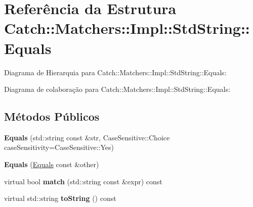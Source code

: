 \hypertarget{structCatch_1_1Matchers_1_1Impl_1_1StdString_1_1Equals}{}\section{Referência da Estrutura Catch\+:\+:Matchers\+:\+:Impl\+:\+:Std\+String\+:\+:Equals}
\label{structCatch_1_1Matchers_1_1Impl_1_1StdString_1_1Equals}


Diagrama de Hierarquia para Catch\+:\+:Matchers\+:\+:Impl\+:\+:Std\+String\+:\+:Equals\+:


Diagrama de colaboração para Catch\+:\+:Matchers\+:\+:Impl\+:\+:Std\+String\+:\+:Equals\+:
\subsection*{Métodos Públicos}
\begin{DoxyCompactItemize}
\item 
{\bfseries Equals} (std\+::string const \&str, Case\+Sensitive\+::\+Choice case\+Sensitivity=Case\+Sensitive\+::\+Yes)\hypertarget{structCatch_1_1Matchers_1_1Impl_1_1StdString_1_1Equals_a5921d5ed75320fb64a678e3f1292a464}{}\label{structCatch_1_1Matchers_1_1Impl_1_1StdString_1_1Equals_a5921d5ed75320fb64a678e3f1292a464}

\item 
{\bfseries Equals} (\hyperlink{structCatch_1_1Matchers_1_1Impl_1_1StdString_1_1Equals}{Equals} const \&other)\hypertarget{structCatch_1_1Matchers_1_1Impl_1_1StdString_1_1Equals_acaa97de06aedf363ae803d65a975f5e4}{}\label{structCatch_1_1Matchers_1_1Impl_1_1StdString_1_1Equals_acaa97de06aedf363ae803d65a975f5e4}

\item 
virtual bool {\bfseries match} (std\+::string const \&expr) const \hypertarget{structCatch_1_1Matchers_1_1Impl_1_1StdString_1_1Equals_a00c8259a76c24da669e116662ededc70}{}\label{structCatch_1_1Matchers_1_1Impl_1_1StdString_1_1Equals_a00c8259a76c24da669e116662ededc70}

\item 
virtual std\+::string {\bfseries to\+String} () const \hypertarget{structCatch_1_1Matchers_1_1Impl_1_1StdString_1_1Equals_a7a09449ff2f858981caf3b1f6c36d270}{}\label{structCatch_1_1Matchers_1_1Impl_1_1StdString_1_1Equals_a7a09449ff2f858981caf3b1f6c36d270}

\end{DoxyCompactItemize}
